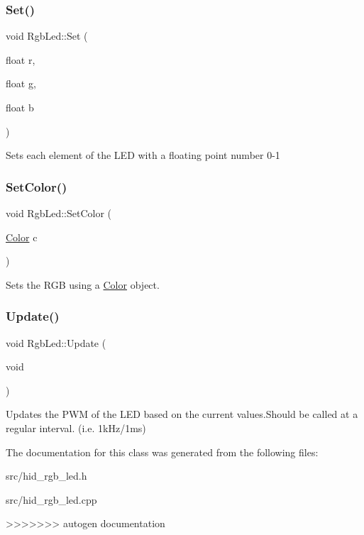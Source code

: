 \subsubsection{\texorpdfstring{Set()}{Set()}}
{\footnotesize\ttfamily void Rgb\+Led\+::\+Set (\begin{DoxyParamCaption}\item[{float}]{r,  }\item[{float}]{g,  }\item[{float}]{b }\end{DoxyParamCaption})}

Sets each element of the L\+ED with a floating point number 0-\/1 \mbox{\label{classdaisy_1_1_rgb_led_a54576a6b4bd3df768562ac677287bc53}} 
\subsubsection{\texorpdfstring{Set\+Color()}{SetColor()}}
{\footnotesize\ttfamily void Rgb\+Led\+::\+Set\+Color (\begin{DoxyParamCaption}\item[{\hyperlink{classdaisy_1_1_color}{Color}}]{c }\end{DoxyParamCaption})}

Sets the R\+GB using a \hyperlink{classdaisy_1_1_color}{Color} object. \mbox{\label{classdaisy_1_1_rgb_led_a9bb58197c1b1a71ffd26a86b26972f60}} 
\subsubsection{\texorpdfstring{Update()}{Update()}}
{\footnotesize\ttfamily void Rgb\+Led\+::\+Update (\begin{DoxyParamCaption}\item[{void}]{ }\end{DoxyParamCaption})}

Updates the P\+WM of the L\+ED based on the current values.\+Should be called at a regular interval. (i.\+e. 1k\+Hz/1ms) 

The documentation for this class was generated from the following files\+:\begin{DoxyCompactItemize}
\item 
src/hid\+\_\+rgb\+\_\+led.\+h\item 
src/hid\+\_\+rgb\+\_\+led.\+cpp\end{DoxyCompactItemize}
>>>>>>> autogen documentation
